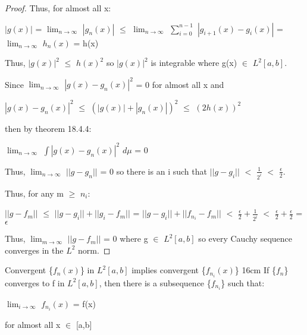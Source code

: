 \begin{proof}
        Thus, for almost all x:

        \hspace{0.5cm}
        $|g(x)|$
        = $\lim_{n \rightarrow \infty}$ $|g_n(x)|$
        $\leq$ $\lim_{n \rightarrow \infty}$
            $\sum_{i=0}^{n-1}$ $|g_{i+1}(x) - g_i(x)|$
        = $\lim_{n \rightarrow \infty}$ $h_n(x)$
        = h(x)

        Thus, $|g(x)|^2$ $\leq$ $h(x)^2$
        so $|g(x)|^2$ is integrable where g(x) $\in$ $L^2[a,b]$.

        Since $\lim_{n \rightarrow \infty}$ $|g(x) - g_n(x)|^2$ = 0
        for almost all x and

        \hspace{0.5cm}
        $|g(x) - g_n(x)|^2$
        $\leq$ $(|g(x)| + |g_n(x)|)^2$
        $\leq$ $(2h(x))^2$
        
        then by {\color{red} theorem 18.4.4}:

        \hspace{0.5cm}
        $\lim_{n \rightarrow \infty}$ $\int |g(x) - g_n(x)|^2$ $d\mu$ = 0

        Thus, $\lim_{n \rightarrow \infty}$ $||g-g_n||$ = 0
        so there is an i such that $||g-g_i||$ $<$ $\frac{1}{2^i}$
        $<$ $\frac{\epsilon}{2}$.

        Thus, for any m $\geq$ $n_i$:

        \hspace{0.5cm}
        $||g - f_m||$
        $\leq$ $||g - g_i|| + ||g_i - f_m||$
        = $||g - g_i|| + ||f_{n_i} - f_m||$
        $<$ $\frac{\epsilon}{2} + \frac{1}{2^i}$
        $<$ $\frac{\epsilon}{2} + \frac{\epsilon}{2}$
        = $\epsilon$

        Thus, $\lim_{m \rightarrow \infty}$ $||g - f_m||$ = 0
        where g $\in$ $L^2[a,b]$
        so every Cauchy sequence converges in the $L^2$ norm.
    \end{proof}

    \vspace{0.5cm}



    \begin{corollary}{Convergent \{$f_n(x)$\} in $L^2[a,b]$
    implies convergent \{$f_{n_i}(x)$\} }{16cm}
        If \{$f_n$\} converges to f in $L^2[a,b]$, then
        there is a subsequence \{$f_{n_i}$\} such that:

        \hspace{0.5cm}
        $\lim_{i \rightarrow \infty}$ $f_{n_i}(x)$ = f(x)

        for almost all x $\in$ [a,b]
    \end{corollary}

